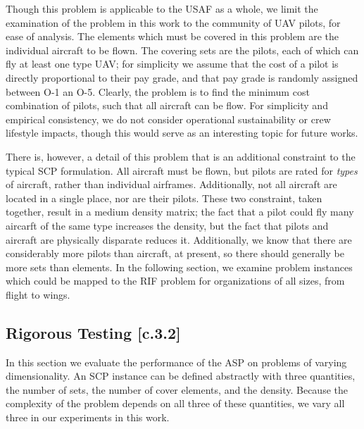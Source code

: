 \documentclass[12pt]{article}
\begin{document}
Though this problem is applicable to the USAF as a whole, we limit the examination of the problem in this work to the community of UAV pilots, for ease of analysis. The elements which must be covered in this problem are the individual aircraft to be flown. The covering sets are the pilots, each of which can fly at least one type UAV; for simplicity we assume that the cost of a pilot is directly proportional to their pay grade, and that pay grade is randomly assigned between O-1 an O-5. Clearly, the problem is to find the minimum cost combination of pilots, such that all aircraft can be flow. For simplicity and empirical consistency, we do not consider operational sustainability or crew lifestyle impacts, though this would serve as an interesting topic for future works. 

There is, however, a detail of this problem that is an additional constraint to the typical SCP formulation. All aircraft must be flown, but pilots are rated for \emph{types} of aircraft, rather than individual airframes. Additionally, not all aircraft are located in a single place, nor are their pilots. These two constraint, taken together, result in a medium density matrix; the fact that a pilot could fly many aircarft of the same type increases the density, but the fact that pilots and aircraft are physically disparate reduces it. Additionally, we know that there are considerably more pilots than aircraft, at present, so there should generally be more sets than elements. In the following section, we examine problem instances which could be mapped to the RIF problem for organizations of all sizes, from flight to wings. 

\subsection{Rigorous Testing [c.3.2]} \label{scn:testing_complete}

In this section we evaluate the performance of the ASP on problems of varying dimensionality. An SCP instance can be defined abstractly with three quantities, the number of sets, the number of cover elements, and the density. Because the complexity of the problem depends on all three of these quantities, we vary all three in our experiments in this work. 
\end{document}
